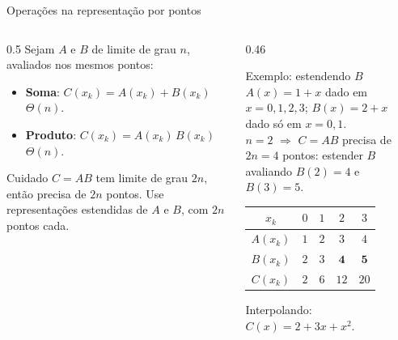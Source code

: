 \documentclass[aspectratio=169,10pt]{beamer}
\begin{document}
\begin{frame}{Operações na representação por pontos}
  \begin{columns}[T]
    \begin{column}{0.5\textwidth}
      Sejam $A$ e $B$ de limite de grau $n$,
      avaliados nos mesmos pontos:
      \begin{itemize}
        \item \textbf{Soma}: $C(x_k) = A(x_k) + B(x_k)$ \;\; $\Theta(n)$.
        \item \textbf{Produto}: $C(x_k) = A(x_k)\,B(x_k)$ \;\; $\Theta(n)$.
      \end{itemize}
      \begin{alertblock}{Cuidado}
        $C = AB$ tem limite de grau $2n$, então precisa de $2n$ pontos.
        Use representações estendidas de $A$ e $B$, com $2n$ pontos cada.
      \end{alertblock}
    \end{column}
    \begin{column}{0.46\textwidth}
      \begin{exampleblock}{Exemplo: estendendo $B$}
        \small
        $A(x) = 1 + x$ dado em $x = 0,1,2,3$; \;
        $B(x) = 2 + x$ dado só em $x = 0,1$.\\[2pt]
        $n = 2$ $\Rightarrow$ $C = AB$ precisa de $2n = 4$ pontos:
        estender $B$ avaliando $B(2) = 4$ e $B(3) = 5$.
        \begin{center}\vspace{-4pt}
          \begin{tabular}{ccccc}
            \toprule
            $x_k$ & $0$ & $1$ & $2$ & $3$ \\
            \midrule
            $A(x_k)$ & $1$ & $2$ & $3$ & $4$ \\
            $B(x_k)$ & $2$ & $3$ & $\mathbf{4}$ & $\mathbf{5}$ \\
            $C(x_k)$ & $2$ & $6$ & $12$ & $20$ \\
            \bottomrule
          \end{tabular}\vspace{-6pt}
        \end{center}
        Interpolando: $C(x) = 2 + 3x + x^2$.
      \end{exampleblock}
    \end{column}
  \end{columns}
\end{frame}
\end{document}
